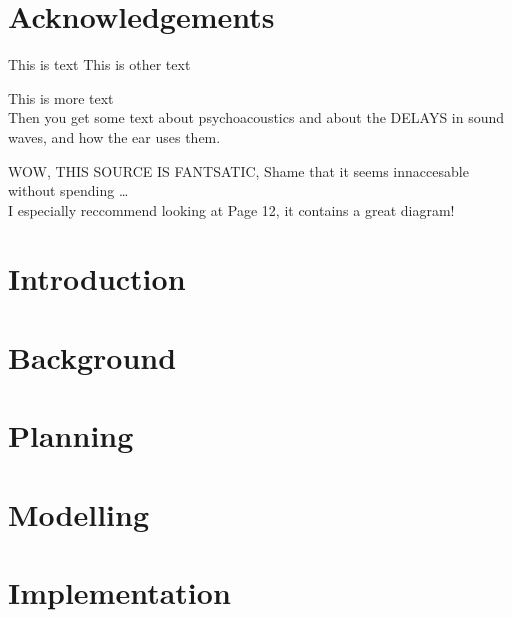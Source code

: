 \documentclass[a4paper, 12pt]{report}
\begin{document}


\abstract{}
\setcounter{page}{2}

\tableofcontents
{}

\listoffigures
{}

\listoftables
{}

\chapter*{Acknowledgements}


This is text \cite{EMHeadsets}
This is other text \cite{EMNoiseCancel}

This is more \cite{ICAAlg&Apps} text\\
Then you get some text about psychoacoustics \cite{MusCogCompSou} and about the DELAYS in sound waves, and how the ear uses them.

WOW, THIS SOURCE\cite{AdvancedDSPing} IS FANTSATIC, Shame that it seems innaccesable without spending \ldots \\
I especially reccommend looking at Page 12, it contains a great diagram!

\chapter{Introduction}

\chapter{Background}

\chapter{Planning}





\chapter{Modelling}



\chapter{Implementation}
\end{document}
